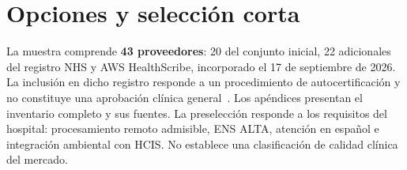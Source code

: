 \clearpage
\section{Opciones y selección corta}
\label{sec:candidatos}
La muestra comprende \textbf{43 proveedores}: 20 del conjunto inicial, 22 adicionales del registro NHS y AWS HealthScribe, incorporado el 17 de septiembre de 2026. La inclusión en dicho registro responde a un procedimiento de autocertificación y no constituye una aprobación clínica general~\cite{EK6X6DWK}. Los apéndices presentan el inventario completo y sus fuentes. La preselección responde a los requisitos del hospital: procesamiento remoto admisible, ENS ALTA, atención en español e integración ambiental con HCIS. No establece una clasificación de calidad clínica del mercado.


